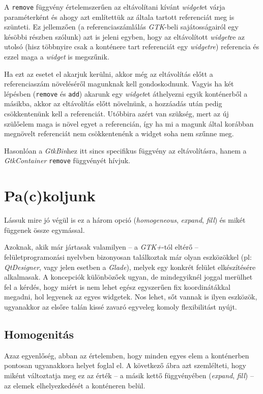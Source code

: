 \documentclass[a4paper,10pt]{article}
\begin{document}
A \texttt{remove} függvény értelemszerűen az eltávolítani kívánt \textit{widget}et várja paraméterként és ahogy azt említettük az általa tartott referenciát meg is szünteti. Ez jellemzően (a referenciaszámlálás \textit{GTK}-beli sajátosságairól egy késöbbi részben szólunk) azt is jeleni egyben, hogy az eltávolított \textit{widget}re az utolsó (hisz többnyire csak a konténere tart referenciát egy \textit{widgetre}) referencia és ezzel maga a \textit{widget} is megszűnik.

Ha ezt az esetet el akarjuk kerülni, akkor még az eltávolítás előtt a referenciaszám növeléséről magunknak kell gondoskodnunk. Vagyis ha két lépésben (\texttt{remove} és \texttt{add}) akarunk egy \textit{widget}et áthelyezni egyik konténerből a másikba, akkor az eltávolítás előtt növelnünk, a hozzáadás után pedig csökkentenünk kell a referenciát. Utóbbira azért van szükség, mert az új szülőelem maga is növel egyet a referencián, így ha mi a magunk által korábban megnövelt referenciát nem csökkentenénk a widget soha nem szűnne meg.

Hasonlóan a \textit{GtkBin}hez itt sincs specifikus függvény az eltávolításra, hanem a \textit{GtkContainer} \texttt{remove} függvényét hívjuk.

\section{Pa(c)koljunk}

Lássuk mire jó végül is ez a három opció (\textit{homogeneous}, \textit{expand}, \textit{fill}) és mikét függenek össze egymással.

Azoknak, akik már jártasak valamilyen -- a \textit{GTK+}-tól eltérő -- felületprogramozási nyelvben bizonyosan találkoztak már olyan eszközökkel (pl: \textit{QtDesigner}, vagy jelen esetben a \textit{Glade}), melyek egy konkrét felület elkészítésére alkalmasak. A koncepciók különbözőek ugyan, de mindegyiknél joggal merülhet fel a kérdés, hogy miért is nem lehet egész egyszerűen fix koordinátákkal megadni, hol legyenek az egyes widgetek. Nos lehet, sőt vannak is ilyen eszközök, ugyanakkor az elsőre talán kissé zavaró egyveleg komoly flexibilitást nyújt.

\subsection{Homogenitás}

Azaz egyenlőség, abban az értelemben, hogy minden egyes elem a konténerben pontosan ugyanakkora helyet foglal el. A következő ábra azt szemlélteti, hogy miként változtatja meg ez az érték -- a másik kettő függvényében (\textit{expand}, \textit{fill}) -- az elemek elhelyezkedését a konténeren belül.
\end{document}
